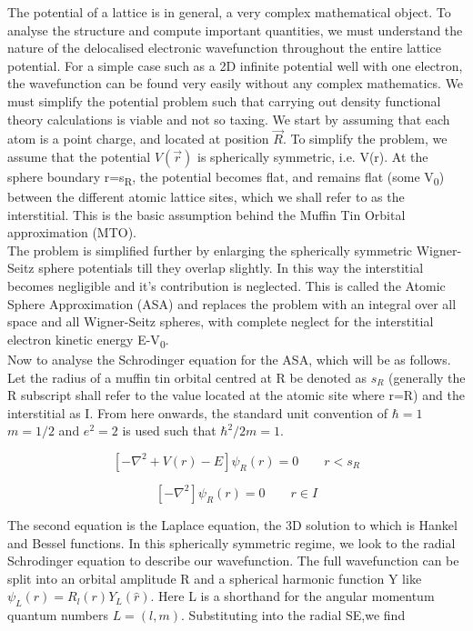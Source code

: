 \documentclass[12pt]{article}
\begin{document}
The potential of a lattice is in general, a very complex mathematical object. To analyse the structure and compute important quantities, we must understand the nature of the delocalised electronic wavefunction throughout the entire lattice potential. For a simple case such as a 2D infinite potential well with one electron, the wavefunction can be found very easily without any complex mathematics. We must simplify the potential problem such that carrying out density functional theory calculations is viable and not so taxing. We start by assuming that each atom is a point charge, and located at position $\vec{R}$. To simplify the problem, we assume that the potential $V(\vec{r})$ is spherically symmetric, i.e. V(r). At the sphere boundary r=s\textsubscript{R}, the potential becomes flat, and remains flat (some V\textsubscript{0}) between the different atomic lattice sites, which we shall refer to as the interstitial. This is the basic assumption behind the Muffin Tin Orbital approximation (MTO). 
\\
The problem is simplified further by enlarging the spherically symmetric Wigner-Seitz sphere potentials till they overlap slightly. In this way the interstitial becomes negligible and it's contribution is neglected. This is called the Atomic Sphere Approximation (ASA) and replaces the problem with an integral over all space and all Wigner-Seitz spheres, with complete neglect for the interstitial electron kinetic energy E-V\textsubscript{0}. 
\\
Now to analyse the Schrodinger equation for the ASA, which will be as follows. Let the radius of a muffin tin orbital centred at R be denoted as $s_R$ (generally the R subscript shall refer to the value located at the atomic site where r=R) and the interstitial as I. From here onwards, the standard unit convention of $\hbar=1$ $m=1/2$ and $e^2=2$ is used such that $\hbar^2/2m=1$.

\begin{equation} \tag{3.1}
[-\nabla^2+V(r)-E]\psi_R(r)=0 \qquad r<s_R 
\end{equation}

\begin{equation} \label{3.2} \tag{3.2}
[-\nabla^2]\psi_R(r)=0  \qquad r\in I
\end{equation}

The second equation is the Laplace equation, the 3D solution to which is Hankel and Bessel functions. In this spherically symmetric regime, we look to the radial Schrodinger equation to describe our wavefunction. The full wavefunction can be split into an orbital amplitude R and a spherical harmonic function Y like $\psi_L(r)=R_l(r)Y_L(\hat{r})$. Here L is a shorthand for the angular momentum quantum numbers $L=(l,m)$. Substituting into the radial SE,we find
\end{document}
